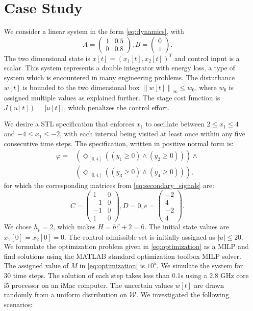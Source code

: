 \documentclass[letterpaper, 10 pt, conference]{ieeeconf}
\begin{document}
\section{Case Study}
\label{sec:case}
We consider a linear system in the form \eqref{eq:dynamics}, with 
\begin{equation*}
A=
\left( \begin{array}{cc} 1 & 0.5 \\ 0 & 0.8 \end{array} \right),
B=
\left( \begin{array}{c} 0 \\ 1 \end{array} \right).
\end{equation*}
The two dimensional state is $x[t]=(x_1[t],x_2[t])^T$ and control input is a scalar. This system represents a double integrator with energy loss, a type of system which is encountered in many engineering problems.
The disturbance $w[t]$ is bounded to the two dimensional box $\left \|w[t] \right \|_\infty \le w_0$, where $w_0$ is assigned multiple values as explained further. The stage cost function is $J(u[t])=\left | u[t] \right |$, which penalizes the control effort.

We desire a STL specification that enforces $x_1$ to oscillate between $2\le x_1\le 4$ and $-4\le x_1\le -2$, with each interval being visited at least once within any five consecutive time steps. The specification, written in positive normal form is:
\begin{equation*}
\begin{split}
\varphi=&\left(\Diamond_{[0,4]} ((y_1\ge 0) \wedge (y_2 \ge 0))\right) \wedge \\ & \left(\Diamond_{[0,4]} ((y_3 \ge 0) \wedge (y_4 \ge 0))\right),
\end{split}
\end{equation*}
for which the corresponding matrices from \eqref{eq:secondary_signals} are:
\begin{equation*}
C=\left( \begin{array}{cc} 1 & 0 \\ -1 & 0 \\ -1 & 0 \\ 1 & 0 \end{array} \right), D=0, e= \left( \begin{array}{c} -2 \\ 4 \\ -2 \\ 4 
\end{array} \right).
\end{equation*}
We chose $h_p=2$, which makes $H=h^\varphi+2=6$. The initial state values are $x_1[0]=x_2[0]=0$. The control admissible set is initially assigned as $\left | u \right | \le 20$.  We formulate the optimization problem given in \eqref{eq:optimization} as a MILP and find solutions using the MATLAB standard optimization toolbox MILP solver. The assigned value of $M$ in \eqref{eq:optimization} is $10^5$. We simulate the system for 30 time steps. The solution of each step takes less than 0.1s using a 2.8 GHz core i5 processor on an iMac computer. The uncertain values $w[t]$ are drawn randomly from a uniform distribution on $\mathcal{W}$. We investigated the following scenarios:
\end{document}
